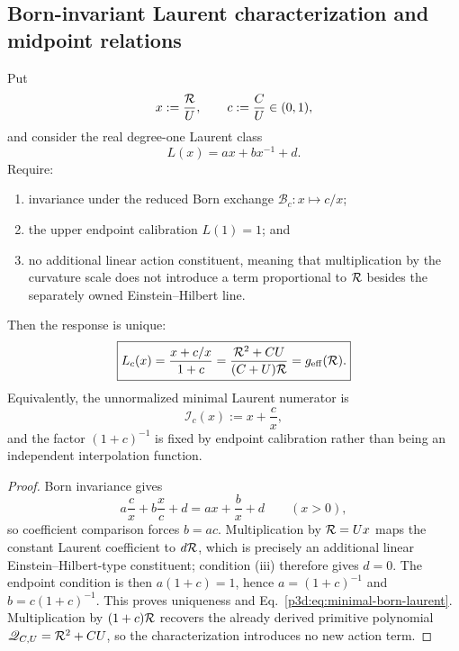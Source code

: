\documentclass[12pt,a4paper]{article}
\begin{document}
\subsection{Born-invariant Laurent characterization and midpoint relations}
\begin{theorem}
\label{p3d:thm:minimal-born-laurent-characterization}
Put
\[
 x:=\frac{\mathcal R}{U},\qquad c:=\frac CU\in(0,1),
\]
and consider the real degree-one Laurent class
\[
 L(x)=a x+b x^{-1}+d.
\]
Require:
\begin{enumerate}[label=\textup{(\roman*)}]
\item invariance under the reduced Born exchange
      \(\mathcal B_c:x\mapsto c/x\);
\item the upper endpoint calibration \(L(1)=1\); and
\item no additional linear action constituent, meaning that multiplication
      by the curvature scale does not introduce a term proportional to
      \(\mathcal R\) besides the separately owned Einstein--Hilbert line.
\end{enumerate}
Then the response is unique:
\begin{equation}
\label{p3d:eq:minimal-born-laurent}
 \boxed{
 L_c(x)=\frac{x+c/x}{1+c}
 =\frac{\mathcal R^2+CU}{(C+U)\mathcal R}
 =g_{\rm eff}(\mathcal R).}
\end{equation}
Equivalently, the unnormalized minimal Laurent numerator is
\[
 \mathcal I_c(x):=x+\frac c x,
\]
and the factor \((1+c)^{-1}\) is fixed by endpoint calibration rather than
being an independent interpolation function.
\end{theorem}

\begin{proof}
Born invariance gives
\[
 a\frac c x+b\frac x c+d=ax+\frac b x+d
 \qquad(x>0),
\]
so coefficient comparison forces \(b=ac\).  Multiplication by \(\mathcal R=Ux\)
maps the constant Laurent coefficient to \(d\mathcal R\), which is precisely an
additional linear Einstein--Hilbert-type constituent; condition
\textup{(iii)} therefore gives \(d=0\).  The endpoint condition is then
\(a(1+c)=1\), hence \(a=(1+c)^{-1}\) and
\(b=c(1+c)^{-1}\).  This proves uniqueness and
Eq.~\eqref{p3d:eq:minimal-born-laurent}.  Multiplication by
\((1+c)\mathcal R\) recovers the already derived primitive polynomial
\(\mathscr Q_{C,U}=\mathcal R^2+CU\), so the characterization introduces no
new action term.
\end{proof}
\end{document}
